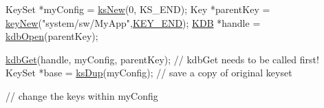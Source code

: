 \begin{DoxyCodeInclude}
KeySet *myConfig = \hyperlink{group__keyset_ga671e1aaee3ae9dc13b4834a4ddbd2c3c}{ksNew}(0, KS\_END);
Key *parentKey = \hyperlink{group__key_gad23c65b44bf48d773759e1f9a4d43b89}{keyNew}(\textcolor{stringliteral}{"system/sw/MyApp"},\hyperlink{group__key_gga91fb3178848bd682000958089abbaf40aa8adb6fcb92dec58fb19410eacfdd403}{KEY\_END});
\hyperlink{classkdb_1_1KDB_a7e0637995ce9f294cdbc6f167df6db40}{KDB} *handle = \hyperlink{group__kdb_ga6808defe5870f328dd17910aacbdc6ca}{kdbOpen}(parentKey);

\hyperlink{group__kdb_ga28e385fd9cb7ccfe0b2f1ed2f62453a1}{kdbGet}(handle, myConfig, parentKey); \textcolor{comment}{// kdbGet needs to be called first!}
KeySet *base = \hyperlink{group__keyset_gac59e4b328245463f1451f68d5106151c}{ksDup}(myConfig); \textcolor{comment}{// save a copy of original keyset}

\textcolor{comment}{// change the keys within myConfig}


\end{DoxyCodeInclude}
